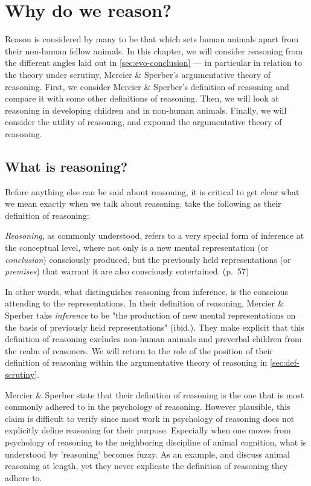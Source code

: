\chapter{Why do we reason?}
\label{ch:reasoning}

Reason is considered by many to be that which sets human animals apart from their non-human fellow animals. In this chapter, we will consider reasoning from the different angles laid out in \cref{sec:evo-conclusion} --- in particular in relation to the theory under scrutiny, Mercier \& Sperber's argumentative theory of reasoning. First, we consider Mercier \& Sperber's definition of reasoning and compare it with some other definitions of reasoning. Then, we will look at reasoning in developing children and in non-human animals. Finally, we will consider the utility of reasoning, and expound the argumentative theory of reasoning.

\section{What is reasoning?}
\label{sec:reasoning-def}

Before anything else can be said about reasoning, it is critical to get clear what we mean exactly when we talk about reasoning. \citet{MS11} take the following as their definition of reasoning:

\begin{quoting}
    \emph{Reasoning}, as commonly understood, refers to a very special form of inference at the conceptual level, where not only is a new mental representation (or \emph{conclusion}) consciously produced, but the previously held representations (or \emph{premises}) that warrant it are also consciously entertained.
    \hfill (p.~57)
\end{quoting}
In other words, what distinguishes reasoning from inference, is the conscious attending to the representations.
In their definition of reasoning, Mercier \& Sperber take \emph{inference} to be "the production of new mental representations on the basis of previously held representations" (ibid.). They make explicit that this definition of reasoning excludes non-human animals and preverbal children from the realm of reasoners.
We will return to the role of the position of their definition of reasoning within the argumentative theory of reasoning in \cref{sec:def-scrutiny}.

Mercier \& Sperber state that their definition of reasoning is the one that is most commonly adhered to in the psychology of reasoning. However plausible, this claim is difficult to verify since most work in psychology of reasoning does not explicitly define reasoning for their purpose. Especially when one moves from psychology of reasoning to the neighboring discipline of animal cognition, what is understood by 'reasoning' becomes fuzzy. As an example, \citet{Andrews15} and \citet{Call06} discuss animal reasoning at length, yet they never explicate the definition of reasoning they adhere to.

